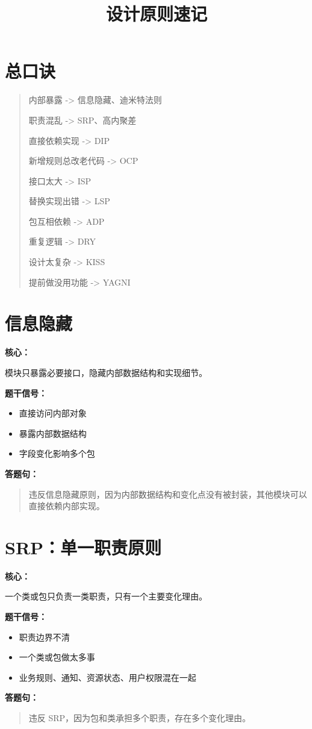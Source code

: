 \documentclass[UTF8,zihao=-4]{ctexart}
\title{\textbf{设计原则速记}}
\author{}
\date{}
\newcommand{\principle}[1]{%
  \section*{\color{TitleBlue}#1}
}
\newcommand{\labeltext}[1]{%
  \textbf{#1}
}
\newenvironment{answerbox}{%
  \begin{quote}\small\color{TextGray}
}{%
  \end{quote}
}
\begin{document}
\maketitle

\section*{\color{TitleBlue}总口诀}

\begin{answerbox}
内部暴露 -> 信息隐藏、迪米特法则

职责混乱 -> SRP、高内聚差

直接依赖实现 -> DIP

新增规则总改老代码 -> OCP

接口太大 -> ISP

替换实现出错 -> LSP

包互相依赖 -> ADP

重复逻辑 -> DRY

设计太复杂 -> KISS

提前做没用功能 -> YAGNI
\end{answerbox}

\principle{信息隐藏}

\labeltext{核心：}
模块只暴露必要接口，隐藏内部数据结构和实现细节。

\labeltext{题干信号：}
\begin{itemize}
  \item 直接访问内部对象
  \item 暴露内部数据结构
  \item 字段变化影响多个包
\end{itemize}

\labeltext{答题句：}
\begin{answerbox}
违反信息隐藏原则，因为内部数据结构和变化点没有被封装，其他模块可以直接依赖内部实现。
\end{answerbox}

\principle{SRP：单一职责原则}

\labeltext{核心：}
一个类或包只负责一类职责，只有一个主要变化理由。

\labeltext{题干信号：}
\begin{itemize}
  \item 职责边界不清
  \item 一个类或包做太多事
  \item 业务规则、通知、资源状态、用户权限混在一起
\end{itemize}

\labeltext{答题句：}
\begin{answerbox}
违反 SRP，因为包和类承担多个职责，存在多个变化理由。
\end{answerbox}
\end{document}

